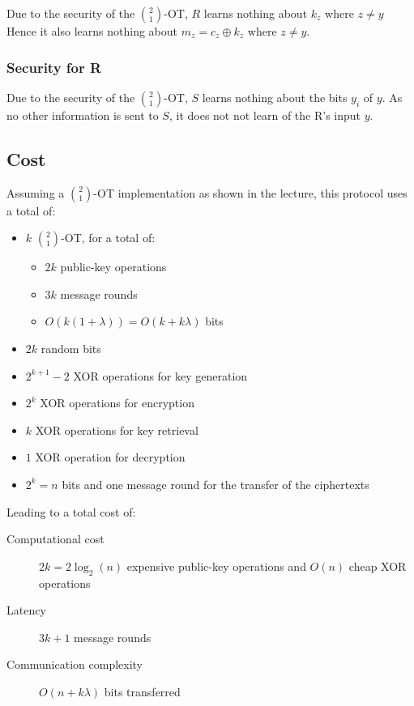 \documentclass[a4paper]{scrreprt}
\begin{document}
Due to the security of the $\binom{2}{1}$-OT, $R$ learns nothing about $k_z$
where $z \neq y$ Hence it also learns nothing about $m_z = c_z \oplus k_z$
where $z \neq y$.

\subsubsection{Security for R}

Due to the security of the $\binom{2}{1}$-OT, $S$ learns nothing about the bits
$y_i$ of $y$. As no other information is sent to $S$, it does not not learn of
the R's input $y$.

\subsection{Cost}

Assuming a $\binom{2}{1}$-OT implementation as shown in the lecture, this
protocol uses a total of:
\begin{itemize}
		\item $k$ $\binom{2}{1}$-OT, for a total of:
				\begin{itemize}
						\item $2k$ public-key operations
						\item $3k$ message rounds
						\item $O(k(1 + \lambda)) = O(k + k \lambda)$ bits
				\end{itemize}
		\item $2k$ random bits
		\item $2^{k+1} - 2$ XOR operations for key generation
		\item $2^k$ XOR operations for encryption
		\item $k$ XOR operations for key retrieval
		\item $1$ XOR operation for decryption
		\item $2^k = n$ bits and one message round for the transfer of the
				ciphertexts
\end{itemize}

Leading to a total cost of:
\begin{description}
		\item[Computational cost] $2k = 2 \log_{2}(n)$ expensive public-key
				operations and $O(n)$ cheap XOR operations
		\item[Latency] $3k + 1$ message rounds
		\item[Communication complexity] $O(n + k \lambda)$ bits transferred
\end{description}
\end{document}

